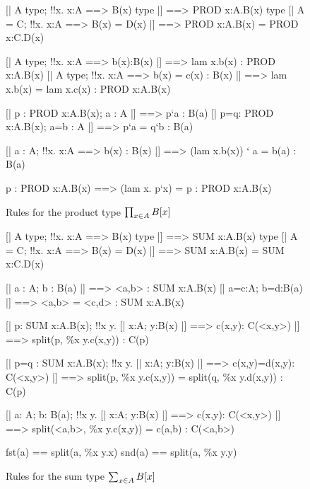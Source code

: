 \begin{figure} 
\begin{ttbox}
     [| A type; !!x. x:A ==> B(x) type |] ==> PROD x:A.B(x) type
    [| A = C;  !!x. x:A ==> B(x) = D(x) |] ==> 
          PROD x:A.B(x) = PROD x:C.D(x)

     [| A type;  !!x. x:A ==> b(x):B(x)
          |] ==> lam x.b(x) : PROD x:A.B(x)
    [| A type;  !!x. x:A ==> b(x) = c(x) : B(x)
          |] ==> lam x.b(x) = lam x.c(x) : PROD x:A.B(x)

     [| p : PROD x:A.B(x);  a : A |] ==> p`a : B(a)
    [| p=q: PROD x:A.B(x);  a=b : A |] ==> p`a = q`b : B(a)

     [| a : A;  !!x. x:A ==> b(x) : B(x)
          |] ==> (lam x.b(x)) ` a = b(a) : B(a)

    p : PROD x:A.B(x) ==> (lam x. p`x) = p : PROD x:A.B(x)
\end{ttbox}
\caption{Rules for the product type $\prod\sb{x\in A}B[x]$} \label{ctt-prod}
\end{figure}


\begin{figure} 
\begin{ttbox}
      [| A type;  !!x. x:A ==> B(x) type |] ==> SUM x:A.B(x) type
     [| A = C;  !!x. x:A ==> B(x) = D(x) 
          |] ==> SUM x:A.B(x) = SUM x:C.D(x)

      [| a : A;  b : B(a) |] ==> <a,b> : SUM x:A.B(x)
     [| a=c:A;  b=d:B(a) |] ==> <a,b> = <c,d> : SUM x:A.B(x)

      [| p: SUM x:A.B(x);  
             !!x y. [| x:A; y:B(x) |] ==> c(x,y): C(<x,y>) 
          |] ==> split(p, \%x y.c(x,y)) : C(p)

     [| p=q : SUM x:A.B(x); 
             !!x y. [| x:A; y:B(x) |] ==> c(x,y)=d(x,y): C(<x,y>)
          |] ==> split(p, \%x y.c(x,y)) = split(q, \%x y.d(x,y)) : C(p)

      [| a: A;  b: B(a);
             !!x y. [| x:A; y:B(x) |] ==> c(x,y): C(<x,y>)
          |] ==> split(<a,b>, \%x y.c(x,y)) = c(a,b) : C(<a,b>)

   fst(a) == split(a, \%x y.x)
   snd(a) == split(a, \%x y.y)
\end{ttbox}
\caption{Rules for the sum type $\sum\sb{x\in A}B[x]$} \label{ctt-sum}
\end{figure}


